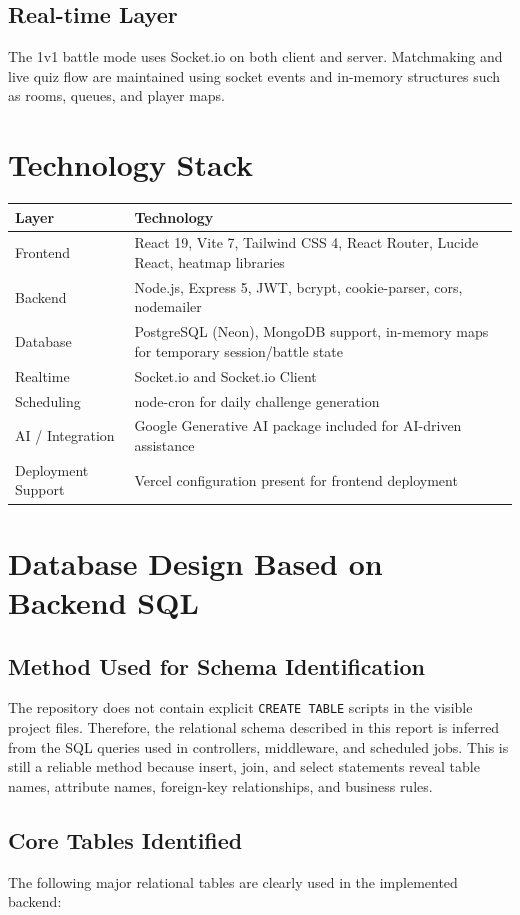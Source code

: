 \documentclass[12pt,a4paper]{article}
\begin{document}
\subsection{Real-time Layer}
The 1v1 battle mode uses Socket.io on both client and server. Matchmaking and live quiz flow are maintained using socket events and in-memory structures such as rooms, queues, and player maps.

\section{Technology Stack}
\begin{longtable}{p{4cm}p{10cm}}
\toprule
\textbf{Layer} & \textbf{Technology} \\
\midrule
Frontend & React 19, Vite 7, Tailwind CSS 4, React Router, Lucide React, heatmap libraries \\
Backend & Node.js, Express 5, JWT, bcrypt, cookie-parser, cors, nodemailer \\
Database & PostgreSQL (Neon), MongoDB support, in-memory maps for temporary session/battle state \\
Realtime & Socket.io and Socket.io Client \\
Scheduling & node-cron for daily challenge generation \\
AI / Integration & Google Generative AI package included for AI-driven assistance \\
Deployment Support & Vercel configuration present for frontend deployment \\
\bottomrule
\end{longtable}

\section{Database Design Based on Backend SQL}
\subsection{Method Used for Schema Identification}
The repository does not contain explicit \texttt{CREATE TABLE} scripts in the visible project files. Therefore, the relational schema described in this report is inferred from the SQL queries used in controllers, middleware, and scheduled jobs. This is still a reliable method because insert, join, and select statements reveal table names, attribute names, foreign-key relationships, and business rules.

\subsection{Core Tables Identified}
The following major relational tables are clearly used in the implemented backend:
\end{document}
